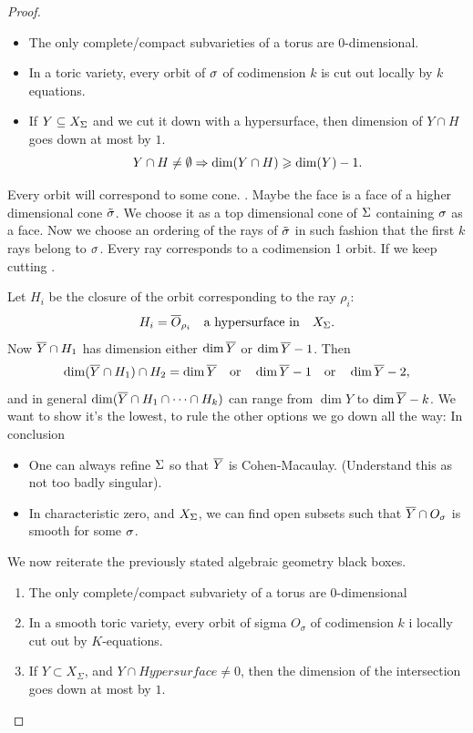 \documentclass[12pt]{memoir}
\theoremstyle{definition}
\begin{document}
\begin{proof}
\begin{itemize}
    \item The only complete/compact subvarieties of a torus are 0-dimensional.
    \item In a toric variety, every orbit of $\sigma$ of codimension $k$ is cut out locally by $k$ equations.
    \item If $Y\subseteq X_\Sigma$ and we cut it down with a hypersurface, then dimension of $Y\cap H$ goes down at most by $1$.
    $$Y\cap H\neq\emptyset\Rightarrow \dim(Y\cap H)\geqslant \dim(Y)-1.$$
\end{itemize}
Every orbit will correspond to some cone. . Maybe the face is a face of a higher dimensional cone $\tilde{\sigma}$. We choose it as a top dimensional cone of $\Sigma$ containing $\sigma$ as a face. Now we choose an ordering of the rays of $\tilde{\sigma}$ in such fashion that the first $k$ rays belong to $\sigma$. Every ray corresponds to a codimension 1 orbit. If we keep cutting .\par 
Let $H_i$ be the closure of the orbit corresponding to the ray $\rho_i$:
$$H_i=\overline O_{\rho_i}\quad\text{a hypersurface in}\quad X_\Sigma.$$
Now $\overline Y\cap H_1$ has dimension either $\dim\overline Y$ or $\dim \overline Y-1$. Then 
$$\dim (\overline Y\cap H_1)\cap H_2=\dim \overline Y\quad\text{or}\quad\dim \overline Y-1\quad\text{or}\quad\dim\overline Y-2,$$
and in general $\dim(\overline Y\cap H_1\cap\cdots\cap H_k)$ can range from $\dim Y$ to $\dim \overline Y-k$. We want to show it's the lowest, to rule the other options we go down all the way:
In conclusion 
\begin{itemize}
    \item One can always refine $\Sigma$ so that $\overline Y$ is Cohen-Macaulay. (Understand this as not too badly singular). 
    \item In characteristic zero, and $X_\Sigma$, we can find open subsets such that $\overline Y\cap O_\sigma$ is smooth for some $\sigma$.
\end{itemize}




We now reiterate the previously stated algebraic geometry black boxes.
\begin{enumerate}
    \item The only complete/compact subvariety of a torus are 0-dimensional
    \item In a smooth toric variety, every orbit of sigma $O_\sigma$ of codimension $k$ i locally cut out by $K$-equations.
    \item If $Y \subset X_\Sigma$, and $Y \cap Hypersurface \neq 0$, then the dimension of the intersection goes down at most by $1$.
\end{enumerate}


\end{proof}
\end{document}
